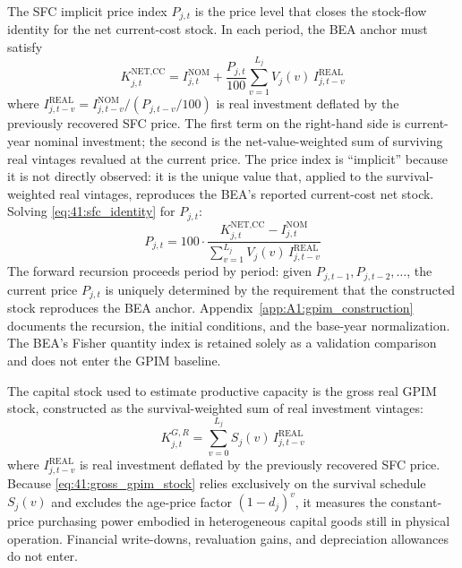 The SFC implicit price index $P_{j,t}$ is the price level that
closes the stock-flow identity for the net current-cost stock. In
each period, the BEA anchor must satisfy
\begin{equation}
	K^{\text{NET,CC}}_{j,t}
	= I^{\text{NOM}}_{j,t}
	+ \frac{P_{j,t}}{100}
	\sum_{v=1}^{L_j} V_j(v)\, I^{\text{REAL}}_{j,t-v}
	\label{eq:41:sfc_identity}
\end{equation}
where $I^{\text{REAL}}_{j,t-v} = I^{\text{NOM}}_{j,t-v}/(P_{j,t-v}/100)$
is real investment deflated by the previously recovered SFC price.
The first term on the right-hand side is current-year nominal
investment; the second is the net-value-weighted sum of surviving
real vintages revalued at the current price. The price index is
``implicit'' because it is not directly observed: it is the unique
value that, applied to the survival-weighted real vintages,
reproduces the BEA's reported current-cost net stock. Solving
\eqref{eq:41:sfc_identity} for $P_{j,t}$:
\begin{equation}
	P_{j,t} = 100 \cdot
	\frac{K^{\text{NET,CC}}_{j,t} - I^{\text{NOM}}_{j,t}}
	{\displaystyle\sum_{v=1}^{L_j} V_j(v)\, I^{\text{REAL}}_{j,t-v}}
	\label{eq:41:sfc_price_recursion}
\end{equation}
The forward recursion proceeds period by period: given
$P_{j,t-1}, P_{j,t-2}, \ldots$, the current price $P_{j,t}$ is
uniquely determined by the requirement that the constructed stock
reproduces the BEA anchor.
Appendix~\ref{app:A1:gpim_construction} documents the recursion, the
initial conditions, and the base-year normalization. The BEA's Fisher
quantity index is retained solely as a validation comparison and does
not enter the GPIM baseline.

The capital stock used to estimate productive capacity is the gross
real GPIM stock, constructed as the survival-weighted sum of real
investment vintages:
\begin{equation}
	K^{G,R}_{j,t} = \sum_{v=0}^{L_j} S_j(v)\,
	I^{\text{REAL}}_{j,t-v}
	\label{eq:41:gross_gpim_stock}
\end{equation}
where $I^{\text{REAL}}_{j,t-v}$ is real investment deflated by the
previously recovered SFC price. Because
\cref{eq:41:gross_gpim_stock} relies exclusively on the survival
schedule $S_j(v)$ and excludes the age-price factor $(1-d_j)^v$, it
measures the constant-price purchasing power embodied in
heterogeneous capital goods still in physical operation. Financial
write-downs, revaluation gains, and depreciation allowances do not
enter.

